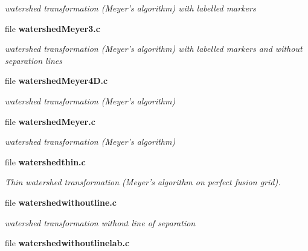 \begin{DoxyCompactItemize}
\begin{DoxyCompactList}\small\item\em watershed transformation (Meyer's algorithm) with labelled markers \item\end{DoxyCompactList}

\item 
file {\bf watershedMeyer3.c}


\begin{DoxyCompactList}\small\item\em watershed transformation (Meyer's algorithm) with labelled markers and without separation lines \item\end{DoxyCompactList}

\item 
file {\bf watershedMeyer4D.c}


\begin{DoxyCompactList}\small\item\em watershed transformation (Meyer's algorithm) \item\end{DoxyCompactList}

\item 
file {\bf watershedMeyer.c}


\begin{DoxyCompactList}\small\item\em watershed transformation (Meyer's algorithm) \item\end{DoxyCompactList}

\item 
file {\bf watershedthin.c}


\begin{DoxyCompactList}\small\item\em Thin watershed transformation (Meyer's algorithm on perfect fusion grid). \item\end{DoxyCompactList}

\item 
file {\bf watershedwithoutline.c}


\begin{DoxyCompactList}\small\item\em watershed transformation without line of separation \item\end{DoxyCompactList}

\item 
file {\bf watershedwithoutlinelab.c}



\end{DoxyCompactItemize}
